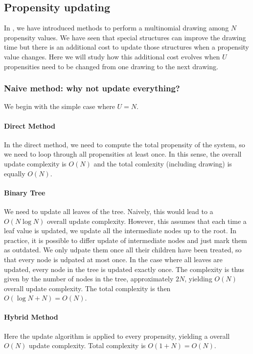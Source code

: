 \subsection {Propensity updating}
\label{sec:reaction_update}

In , we have introduced methods to perform a multinomial drawing among $N$ propensity values. We have seen that special structures can improve the drawing time but there is an additional cost to update those structures when a propensity value changes. Here we will study how this additional cost evolves when $U$ propensities need to be changed from one drawing to the next drawing.

\subsubsection {Naive method: why not update everything?}

We begin with the simple case where $U = N$.

\paragraph{Direct Method} In the direct method, we need to compute the total propensity of the system, so we need to loop through all propensities at least once. In this sense, the overall update complexity is $O(N)$ and the total comlexity (including drawing) is equally $O(N)$.

\paragraph{Binary Tree} We need to update all leaves of the tree. Naively, this would lead to a $O(N\log N)$ overall update complexity. However, this assumes that each time a leaf value is updated, we update all the intermediate nodes up to the root. In practice, it is possible to differ update of intermediate nodes and just mark them as outdated. We only udpate them once all their children have been treated, so that every node is udpated at most once. In the case where all leaves are updated, every node in the tree is updated exactly once. The complexity is thus given by the number of nodes in the tree, approximately $2N$, yielding $O(N)$ overall update complexity. The total complexity is then $O(\log N + N) = O(N)$.

\paragraph{Hybrid Method} Here the update algorithm is applied to every propensity, yielding a overall $O(N)$ update complexity. Total complexity is $O(1 + N) = O(N)$.

